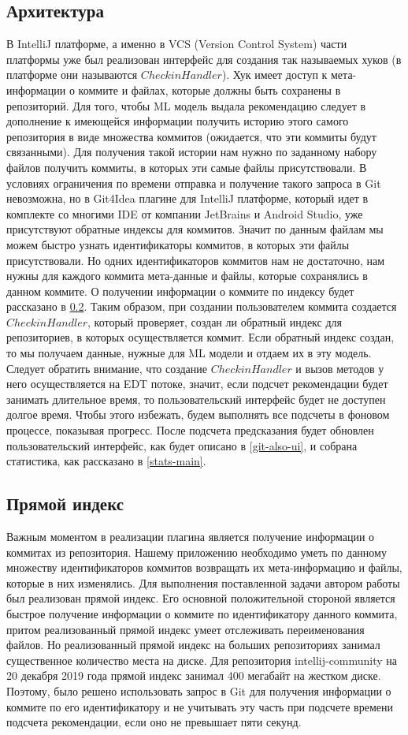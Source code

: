 \documentclass[times]{itmo-student-thesis}
\begin{document}
\subsection{Архитектура}
В IntelliJ платформе, а именно в VCS (Version Control System) части платформы уже был реализован интерфейс для создания так называемых хуков (в платформе они называются $CheckinHandler$). Хук имеет доступ к мета-информации о коммите и файлах, которые должны быть сохранены в репозиторий. Для того, чтобы ML модель выдала рекомендацию следует в дополнение к имеющейся информации получить историю этого самого репозитория в виде множества коммитов (ожидается, что эти коммиты будут связанными). Для получения такой истории нам нужно по заданному набору файлов получить коммиты, в которых эти самые файлы присутствовали. В условиях ограничения по времени отправка и получение такого запроса в Git невозможна, но в Git4Idea плагине для IntelliJ платформе, который идет в комплекте со многими IDE от компании JetBrains и Android Studio, уже присутствуют обратные индексы для коммитов. Значит по данным файлам мы можем быстро узнать идентификаторы коммитов, в которых эти файлы присутствовали. Но одних идентификаторов коммитов нам не достаточно, нам нужны для каждого коммита мета-данные и файлы, которые сохранялись в данном коммите. О получении информации о коммите по индексу будет рассказано в \ref{forward-index}. Таким образом, при создании пользователем коммита создается $CheckinHandler$, который проверяет, создан ли обратный индекс для репозиториев, в которых осуществляется коммит. Если обратный индекс создан, то мы получаем данные, нужные для ML модели и отдаем их в эту модель. Следует обратить внимание, что создание $CheckinHandler$ и вызов методов у него осуществляется на EDT потоке, значит, если подсчет рекомендации будет занимать длительное время, то пользовательский интерфейс будет не доступен долгое время. Чтобы этого избежать, будем выполнять все подсчеты в фоновом процессе, показывая прогресс. После подсчета предсказания будет обновлен пользовательский интерфейс, как будет описано в \ref{git-also-ui}, и собрана статистика, как рассказано в \ref{stats-main}.
\subsection{Прямой индекс}\label{forward-index}
Важным моментом в реализации плагина является получение информации о коммитах из репозитория. Нашему приложению необходимо уметь по данному множеству идентификаторов коммитов возвращать их мета-информацию и файлы, которые в них изменялись. Для выполнения поставленной задачи автором работы был реализован прямой индекс. Его основной положительной стороной является быстрое получение информации о коммите по идентификатору данного коммита, притом реализованный прямой индекс умеет отслеживать переименования файлов. Но реализованный прямой индекс на больших репозиториях занимал существенное количество места на диске. Для репозитория intellij-community на 20 декабря 2019 года прямой индекс занимал 400 мегабайт на жестком диске. Поэтому, было решено использовать запрос в Git для получения информации о коммите по его идентификатору и не учитывать эту часть при подсчете времени подсчета рекомендации, если оно не превышает пяти секунд.
\end{document}
